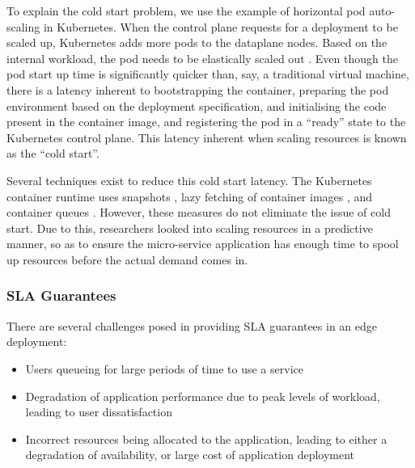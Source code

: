 To explain the cold start problem, we use the example of horizontal pod auto-scaling in Kubernetes. When the control plane requests for a deployment to be scaled up, Kubernetes adds more pods to the dataplane nodes.  Based on the internal workload, the pod needs to be elastically scaled out \cite{beni2021reducing}. Even though the pod start up time is significantly quicker than, say, a traditional virtual machine, there is a latency inherent to bootstrapping the container, preparing the pod environment based on the deployment specification, and initialising the code present in the container image, and registering the pod in a ``ready'' state to the Kubernetes control plane. This latency inherent when scaling resources is known as the ``cold start''.\par

Several techniques exist to reduce this cold start latency. The Kubernetes container runtime uses snapshots \cite{cadden2019seuss}, lazy fetching of container images \cite{lorenzo2019fogdocker}, and container queues \cite{lin2019mitigating}. However, these measures do not eliminate the issue of cold start. Due to this, researchers looked into scaling resources in a predictive manner, so as to ensure the micro-service application has enough time to spool up resources before the actual demand comes in.\par

\subsubsection{SLA Guarantees}
\label{subsubsec:sla-edge}

There are several challenges posed in providing SLA guarantees in an edge deployment:
\begin{itemize}
    \item Users queueing for large periods of time to use a service \cite{venticinque2011cloud}
    \item Degradation of application performance due to peak levels of workload, leading to user dissatisfaction \cite{sakr2012sla}
    \item Incorrect resources being allocated to the application, leading to either a degradation of availability, or large cost of application deployment \cite{houlihan2014auditing}
\end{itemize}

